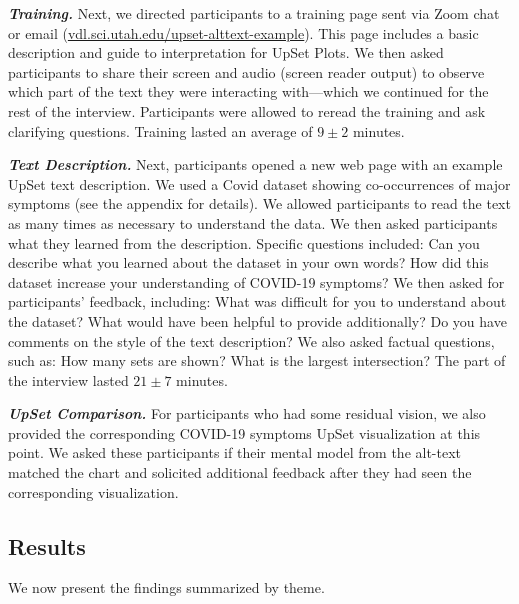\documentclass{egpubl}
\newcommand\asLink[2]{\textcolor{linkColor}{\href{#1}{\ul{#2}}}}
\newcommand{\parahead}[1]
{\vspace{0.25em}\noindent \textbf{\textit{#1.}}}
\begin{document}
\parahead{Training}
Next, we directed participants to a training page sent via Zoom chat or email (\asLink{https://vdl.sci.utah.edu/upset-alttext-example/}{vdl.sci.utah.edu/upset-alttext-example}).
This page includes a basic description and guide to interpretation for UpSet Plots.
We then asked participants to share their screen and audio (screen reader output) to observe which part of the text they were interacting with---which we continued for the rest of the interview.
Participants were allowed to reread the training and ask clarifying questions.
Training lasted an average of $9\pm 2$ minutes.

\parahead{Text Description}
Next, participants opened a new web page with an example UpSet text description.
We used a Covid dataset showing co-occurrences of major symptoms (see the appendix for details).
We allowed participants to read the text as many times as necessary to understand the data.
We then asked participants what they learned from the description.
Specific questions included:
Can you describe what you learned about the dataset in your own words?
How did this dataset increase your understanding of COVID-19 symptoms?
We then asked for participants' feedback, including: What was difficult for you to understand about the dataset? What would have been helpful to provide additionally? Do you have comments on the style of the text description? We also asked factual questions, such as: How many sets are shown? What is the largest intersection? The part of the interview lasted $21\pm 7$ minutes.


\parahead{UpSet Comparison}
For participants who had some residual vision, we also
provided the corresponding COVID-19 symptoms UpSet visualization at this point.
We asked these participants if their mental model from the alt-text matched the chart and solicited additional feedback after they had seen the corresponding visualization.

\subsection{Results}
We now present the findings summarized by theme.
\end{document}
